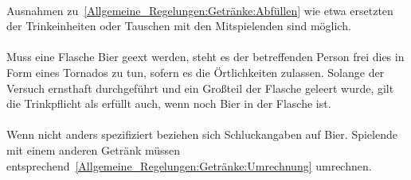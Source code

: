 \paragraph{}
Ausnahmen zu~\ref{Allgemeine_Regelungen:Getränke:Abfüllen} wie etwa ersetzten der Trinkeinheiten oder Tauschen mit den Mitspielenden sind möglich.

\paragraph{}
Muss eine Flasche Bier geext werden, steht es der betreffenden Person frei dies in Form eines Tornados zu tun, sofern es die Örtlichkeiten zulassen.
Solange der Versuch ernsthaft durchgeführt und ein Großteil der Flasche geleert wurde, gilt die Trinkpflicht als erfüllt auch, wenn noch Bier in der Flasche ist.

\paragraph{}
Wenn nicht anders spezifiziert beziehen sich Schluckangaben auf Bier.
Spielende mit einem anderen Getränk müssen entsprechend~\ref{Allgemeine_Regelungen:Getränke:Umrechnung} umrechnen.
